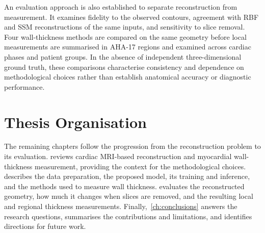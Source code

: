 An evaluation approach is also established to separate reconstruction from
measurement. It examines fidelity to the observed contours, agreement with
RBF and SSM reconstructions of the same inputs, and sensitivity to slice
removal. Four wall-thickness methods are compared on the same geometry
before local measurements are summarised in AHA-17 regions and examined
across cardiac phases and patient groups. In the absence of independent
three-dimensional ground truth, these comparisons characterise consistency
and dependence on methodological choices rather than establish anatomical
accuracy or diagnostic performance.

\section{Thesis Organisation}
\label{sec:thesis-organisation}
\noindent
The remaining chapters follow the progression from the reconstruction problem
to its evaluation.  reviews cardiac MRI-based
reconstruction and myocardial wall-thickness measurement, providing the
context for the methodological choices.  describes the
data preparation, the proposed model, its training and inference, and the
methods used to measure wall thickness.  evaluates the
reconstructed geometry, how much it changes when slices are removed, and the
resulting local and regional thickness measurements. Finally,~\cref{ch:conclusions} answers the
research questions, summarises the contributions and limitations, and
identifies directions for future work.
